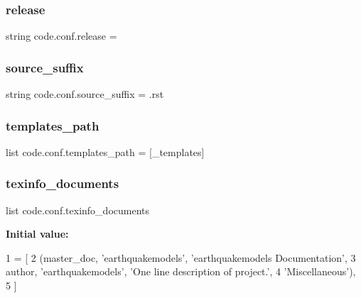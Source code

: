 \subsubsection{\texorpdfstring{release}{release}}
{\footnotesize\ttfamily string code.\+conf.\+release = \textquotesingle{}\textquotesingle{}}

\mbox{\label{namespacecode_1_1conf_a76116ff8eafb430b001d391bb5aabcd3}} 
\subsubsection{\texorpdfstring{source\+\_\+suffix}{source\_suffix}}
{\footnotesize\ttfamily string code.\+conf.\+source\+\_\+suffix = \textquotesingle{}.rst\textquotesingle{}}

\mbox{\label{namespacecode_1_1conf_adf9ec1a8ebb5b51113bdce170affcb5f}} 
\subsubsection{\texorpdfstring{templates\+\_\+path}{templates\_path}}
{\footnotesize\ttfamily list code.\+conf.\+templates\+\_\+path = \mbox{[}\textquotesingle{}\+\_\+templates\textquotesingle{}\mbox{]}}

\mbox{\label{namespacecode_1_1conf_a4dc7293e0ef1c9e0a3c9f46b18d06e3c}} 
\subsubsection{\texorpdfstring{texinfo\+\_\+documents}{texinfo\_documents}}
{\footnotesize\ttfamily list code.\+conf.\+texinfo\+\_\+documents}

{\bfseries Initial value\+:}
\begin{DoxyCode}
1 =  [
2     (master\_doc, \textcolor{stringliteral}{'earthquakemodels'}, \textcolor{stringliteral}{'earthquakemodels Documentation'},
3      author, \textcolor{stringliteral}{'earthquakemodels'}, \textcolor{stringliteral}{'One line description of project.'},
4      \textcolor{stringliteral}{'Miscellaneous'}),
5 ]
\end{DoxyCode}
\mbox{\label{namespacecode_1_1conf_a596f57833f601e4031318113e26195c9}} 
